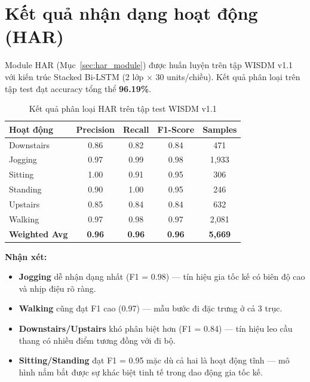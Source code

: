 
\section{Kết quả nhận dạng hoạt động (HAR)}
\label{sec:har_results}

Module HAR (Mục~\ref{sec:har_module}) được huấn luyện trên tập WISDM v1.1 với kiến trúc Stacked Bi-LSTM (2 lớp $\times$ 30 units/chiều). Kết quả phân loại trên tập test đạt accuracy tổng thể \textbf{96.19\%}.

\begin{table}[H]
\centering
\caption{Kết quả phân loại HAR trên tập test WISDM v1.1}
\label{tab:har_test_results}
\small
\begin{tabular}{|l|c|c|c|c|}
\hline
\textbf{Hoạt động} & \textbf{Precision} & \textbf{Recall} & \textbf{F1-Score} & \textbf{Samples} \\
\hline
Downstairs & 0.86 & 0.82 & 0.84 & 471 \\
Jogging    & 0.97 & 0.99 & 0.98 & 1{,}933 \\
Sitting    & 1.00 & 0.91 & 0.95 & 306 \\
Standing   & 0.90 & 1.00 & 0.95 & 246 \\
Upstairs   & 0.85 & 0.84 & 0.84 & 632 \\
Walking    & 0.97 & 0.98 & 0.97 & 2{,}081 \\
\hline
\textbf{Weighted Avg} & \textbf{0.96} & \textbf{0.96} & \textbf{0.96} & \textbf{5{,}669} \\
\hline
\end{tabular}
\end{table}

\textbf{Nhận xét:}
\begin{itemize}
    \item \textbf{Jogging} dễ nhận dạng nhất (F1 = 0.98) — tín hiệu gia tốc kế có biên độ cao và nhịp điệu rõ ràng.
    \item \textbf{Walking} cũng đạt F1 cao (0.97) — mẫu bước đi đặc trưng ở cả 3 trục.
    \item \textbf{Downstairs/Upstairs} khó phân biệt hơn (F1 = 0.84) — tín hiệu leo cầu thang có nhiều điểm tương đồng với đi bộ.
    \item \textbf{Sitting/Standing} đạt F1 = 0.95 mặc dù cả hai là hoạt động tĩnh — mô hình nắm bắt được sự khác biệt tinh tế trong dao động gia tốc kế.
\end{itemize}

